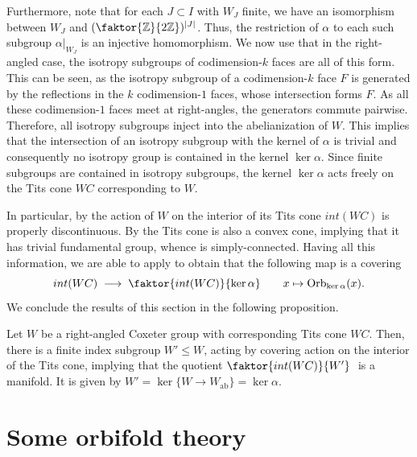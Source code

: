 \noindent
Furthermore, note that for each \(J \subset I\) with \(W_J\) finite, we have an isomorphism between \(W_J\) and \((\faktor{\Z}{2\Z})^{\abs{J}}\).
Thus, the restriction of \(\alpha\) to each such subgroup \(\alpha\vert_{W_J}\) is an injective homomorphism.
We now use that in the right-angled case, the isotropy subgroups of codimension-\(k\) faces are all of this form.
This can be seen, as the isotropy subgroup of a codimension-\(k\) face \(F\) is generated by the reflections in the \(k\) codimension-\(1\) faces, whose intersection forms \(F\).
As all these codimension-\(1\) faces meet at right-angles, the generators commute pairwise.
Therefore, all isotropy subgroups inject into the abelianization of \(W\).
This implies that the intersection of an isotropy subgroup with the kernel of \(\alpha\) is trivial and consequently no isotropy group is contained in the kernel \(\ker\alpha\).
Since finite subgroups are contained in isotropy subgroups, the kernel \(\ker\alpha\) acts freely on the Tits cone \(WC\) corresponding to \(W\).

In particular, by  the action of \(W\) on the interior of its Tits cone \(int(WC)\) is properly discontinuous.
By  the Tits cone is also a convex cone, implying that it has trivial fundamental group, whence is simply-connected.
Having all this information, we are able to apply  to obtain that the following map is a covering
\[int(WC) \;\longrightarrow\; \faktor{int(WC)}{\ker\alpha} \qquad x \mapsto \text{Orb}_{\ker\alpha}(x).\]
We conclude the results of this section in the following proposition.

\begin{proposition}
    Let \(W\) be a right-angled Coxeter group with corresponding Tits cone \(WC\).
    Then, there is a finite index subgroup \(W' \leq W\), acting by covering action on the interior of the Tits cone, implying that the quotient \(\faktor{int(WC)}{W'}\;\) is a manifold.
    It is given by \(W' = \ker\{W \to W_{\text{ab}}\} = \ker\alpha\).
\end{proposition}


\section{Some orbifold theory}

